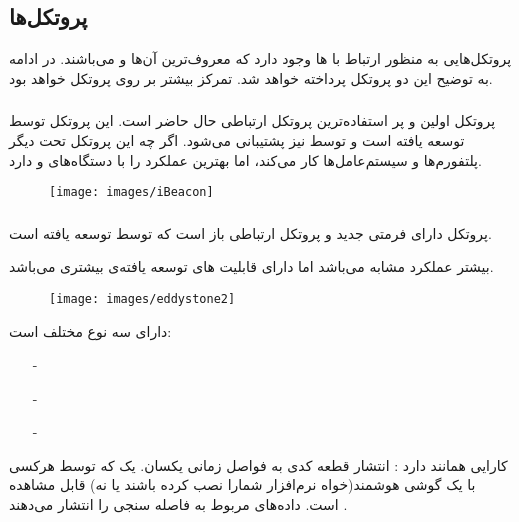 \documentclass[oneside]{report}
\begin{document}
   \subsection{پروتکل‌ها}
		
		پروتکل‌هایی به منظور ارتباط با 
		{\normalsize {}} ها
		وجود دارد که معروف‌ترین آن‌ها 
		{\normalsize {}} 
		و
		{\normalsize {}}                    
		می‌باشند. در ادامه به توضیح این دو پروتکل پرداخته خواهد شد.  تمرکز بیشتر بر روی پروتکل 
				{\normalsize {}} 
				خواهد بود.
	\subsubsection{{\small {}} }
	پروتکل
			{\normalsize {}} 
اولین و پر استفاده‌ترین پروتکل ارتباطی حال حاضر است. این پروتکل توسط 
		{\normalsize {}} 
		توسعه یافته است و توسط 
				{\normalsize {}} 
نیز پشتیبانی می‌شود. اگر چه این پروتکل تحت دیگر پلتفورم‌ها و سیستم‌عامل‌ها کار می‌کند، اما بهترین عملکرد را با دستگاه‌های 
		{\normalsize {}} 
		و 
				{\normalsize {}} 
				دارد. 				
	\begin{figure}[h]
		\centering
		\texttt{[image: images/iBeacon]}
		\caption{{\small {}} }
		\label{fig:ibeacon}
	\end{figure}
	
	
		
	\subsubsection{{\small {}} }	
پروتکل 
		{\normalsize {}} 
 دارای فرمتی جدید و پروتکل ارتباطی باز است که توسط 
 		{\normalsize {}} 
 		توسعه یافته است. 
	
		بیشتر عملکرد 
				{\normalsize {}} 
				مشابه 
						{\normalsize {}} 
						می‌باشد اما دارای قابلیت های توسعه یافته‌ی بیشتری می‌باشد. 
						\begin{figure}[h]
							\centering
							\texttt{[image: images/eddystone2]}
							\caption{{\small {}} }
							\label{fig:eddystone2}
						\end{figure}
			{\normalsize {}} 
			دارای سه نوع مختلف است: 
	\begin{itemize}
		\item[-] 				{\normalsize {}} 
		\item[-] 				{\normalsize {}} 
		\item[-] 				{\normalsize {}} 
	\end{itemize}
	{\normalsize {}} 
	کارایی همانند 
	 		{\normalsize {}} 
	 		دارد : انتشار قطعه کدی به فواصل زمانی یکسان. 
		{\normalsize {}}
		یک 
			{\normalsize {}} 
			که توسط هرکسی با یک گوشی هوشمند(خواه نرم‌افزار شمارا نصب کرده باشند یا نه) قابل مشاهده است. 
			{\normalsize {}}
داده‌های مربوط به فاصله سنجی را انتشار می‌دهند .
\cite{kontakt}
\end{document}
